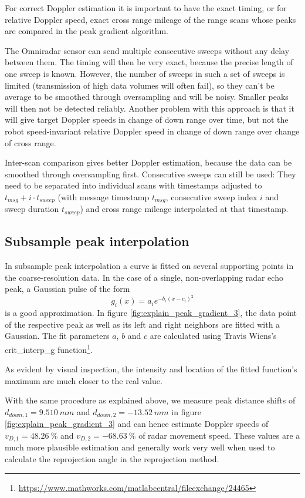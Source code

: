 For correct Doppler estimation it is important to have the exact timing,
or for relative Doppler speed, exact cross range mileage of the range
scans whose peaks are compared in the peak gradient algorithm.

The Omniradar sensor can send multiple consecutive sweeps without any
delay between them. The timing will then be very exact, because the
precise length of one sweep is known. However, the number of sweeps in
such a set of sweeps is limited (transmission of high data volumes will
often fail), so they can't be average to be smoothed through
oversampling and will be noisy. Smaller peaks will then not be detected
reliably. Another problem with this approach is that it will give target
Doppler speeds in change of down range over time, but not the robot
speed-invariant relative Doppler speed in change of down range over
change of cross range.

Inter-scan comparison gives better Doppler estimation, because the data
can be smoothed through oversampling first. Consecutive sweeps can still
be used: They need to be separated into individual scans with timestamps
adjusted to \(t_{msg} + i\cdot t_{sweep}\) (with message timestamp
\(t_{msg}\), consecutive sweep index \(i\) and sweep duration
\(t_{sweep}\)) and cross range mileage interpolated at that timestamp.

\subsection{Subsample peak interpolation}\label{subsample-peak-interpolation}

In subsample peak interpolation a curve is fitted on several supporting
points in the coarse-resolution data. In the case of a single,
non-overlapping radar echo peak, a Gaussian pulse of the form
\[g_i(x) = a_i e^{-b_i ( x - c_i )^2}\] is a good approximation. In
figure \cref{fig:explain_peak_gradient_3}, the data point of the respective peak as well as its left
and right neighbors are fitted with a Gaussian. The fit parameters
\(a\), \(b\) and \(c\) are calculated using Travis
Wiens's crit\_interp\_g function\footnote{\url{https://www.mathworks.com/matlabcentral/fileexchange/24465}}.

As evident by visual inspection, the intensity and location of the
fitted function's maximum are much closer to the real value.

With the same procedure as explained above, we measure peak distance
shifts of \(d_{down,1}=\SI{9.510}{mm}\) and \(d_{down,2}=-\SI{13.52}{mm}\) in figure
\cref{fig:explain_peak_gradient_3} and can hence estimate Doppler speeds of \(v_{D,1}=\SI{48.26}{\%}\) and
\(v_{D,2}=-\SI{68.63}{\%}\) of radar movement speed. These values are a much
more plausible estimation and generally work very well when used to
calculate the reprojection angle in the reprojection method.

